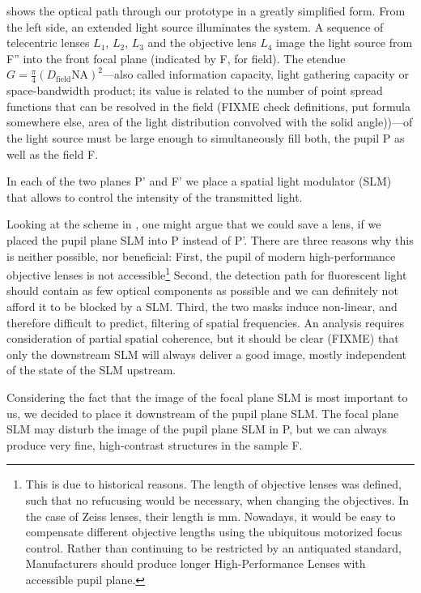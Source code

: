  shows the optical path through our prototype
in a greatly simplified form.  From the left side, an extended light
source illuminates the system. A sequence of telecentric lenses $L_1$,
$L_2$, $L_3$ and the objective lens $L_4$ image the light source from
F'' into the front focal plane (indicated by F, for field). The
etendue $G=\frac{\pi}{4}(D_\textrm{field}\textrm{NA})^2$---also called
information capacity, light gathering capacity or space-bandwidth
product; its value is related to the number of point spread functions
that can be resolved in the field (FIXME check definitions, put
formula somewhere else, area of the light distribution convolved with
the solid angle))---of the light source must be large enough to
simultaneously fill both, the pupil P as well as the field F.

In each of the two planes P' and F' we place a spatial light modulator
(SLM) that allows to control the intensity of the transmitted light.

Looking at the scheme in , one might argue
that we could save a lens, if we placed the pupil plane SLM into P
instead of P'. There are three reasons why this is neither possible,
nor beneficial: First, the pupil of modern high-performance objective
lenses is not accessible\footnote{This is due to historical reasons.
The length of objective lenses was defined, such that no refucusing
would be necessary, when changing the objectives. In the case of Zeiss
lenses, their length is \unit[45]{mm}. Nowadays, it would be easy to
compensate different objective lengths using the ubiquitous motorized
focus control.  Rather than continuing to be restricted by an
antiquated standard, Manufacturers should produce longer
High-Performance Lenses with accessible pupil plane.}  Second, the
detection path for fluorescent light should contain as few optical
components as possible and we can definitely not afford it to be
blocked by a SLM.  Third, the two masks induce non-linear, and
therefore difficult to predict, filtering of spatial frequencies. An
analysis requires consideration of partial spatial coherence, but it
should be clear (FIXME) that only the downstream SLM will always deliver a good
image, mostly independent of the state of the SLM upstream.

Considering the fact that the image of the focal plane SLM is most
important to us, we decided to place it downstream of the pupil plane
SLM. The focal plane SLM may disturb the image of the pupil plane SLM
in P, but we can always produce very fine, high-contrast structures in
the sample F.

